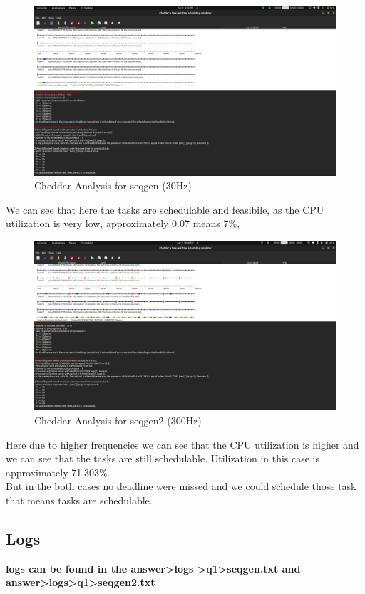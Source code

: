 \documentclass[a4paper,11pt]{article}%
\newenvironment{qanda}{\setlength{\parindent}{0pt}}{\bigskip}
\begin{document}
\begin{qanda}
\begin{enumerate}
			\begin{figure}[H]
				\centering
				\includegraphics[scale=0.25]{figures/seqgen.png}
				\caption{Cheddar Analysis for seqgen (30Hz)}

			\end{figure}
			We can see that here the tasks are schedulable and feasibile, as the CPU utilization is very low, approximately 0.07 means 7\%,

			\begin{figure}[H]
				\centering
				\includegraphics[scale=0.25]{figures/seqgen2x.png}
				\caption{Cheddar Analysis for seqgen2 (300Hz)}
			\end{figure}
			Here due to higher frequencies we can see that the CPU utilization is higher and we can see that the tasks are still schedulable.
			Utilization in this case is approximately 71.303\%.\\

			But in the both cases no deadline were missed and we could schedule those task that means tasks are schedulable.
			\subsection{Logs}
			\textbf{logs can be found in the answer\textgreater logs \textgreater q1\textgreater seqgen.txt and answer\textgreater logs\textgreater q1\textgreater seqgen2.txt}


\end{enumerate}
\end{qanda}
\end{document}
